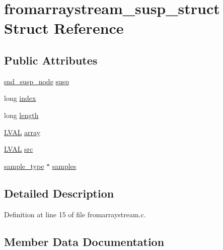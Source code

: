 \hypertarget{structfromarraystream__susp__struct}{}\section{fromarraystream\+\_\+susp\+\_\+struct Struct Reference}
\label{structfromarraystream__susp__struct}
\subsection*{Public Attributes}
\begin{DoxyCompactItemize}
\item 
\hyperlink{sound_8h_a6b268203688a934bd798ceb55f85d4c0}{snd\+\_\+susp\+\_\+node} \hyperlink{structfromarraystream__susp__struct_afa85d903f74b25087098cd156851b1fd}{susp}
\item 
long \hyperlink{structfromarraystream__susp__struct_a6571efd30efe75963d829e982b17c44d}{index}
\item 
long \hyperlink{structfromarraystream__susp__struct_a8062d1e8abfd3a51f5d58ad2fe9eb062}{length}
\item 
\hyperlink{xldmem_8h_a9a9ec6a5fbca2b40ed8d19faa799be8c}{L\+V\+AL} \hyperlink{structfromarraystream__susp__struct_a513040d7e80a6bf558c8de8aedfcacb1}{array}
\item 
\hyperlink{xldmem_8h_a9a9ec6a5fbca2b40ed8d19faa799be8c}{L\+V\+AL} \hyperlink{structfromarraystream__susp__struct_a935dedff401014457512fa8707c95e0a}{src}
\item 
\hyperlink{sound_8h_a3a9d1d4a1c153390d2401a6e9f71b32c}{sample\+\_\+type} $\ast$ \hyperlink{structfromarraystream__susp__struct_ab243bcc37afdd3437eb0bb2098239862}{samples}
\end{DoxyCompactItemize}


\subsection{Detailed Description}


Definition at line 15 of file fromarraystream.\+c.



\subsection{Member Data Documentation}
